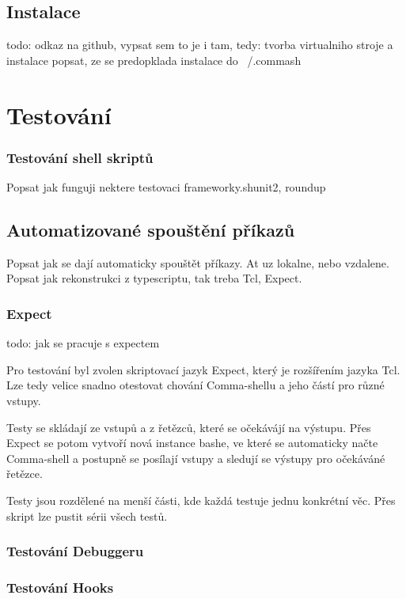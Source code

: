 \documentclass[thesis=M,czech]{FITthesis}[2012/06/26]
\begin{document}
\section{Instalace}
todo: odkaz na github, vypsat sem to je i tam, tedy: tvorba virtualniho stroje a instalace
popsat, ze se predopklada instalace do ~/.commash


%
%
\chapter{Testování}


\subsection{Testování shell skriptů}
Popsat jak funguji nektere testovaci frameworky.shunit2, roundup


\section{Automatizované spouštění příkazů}
Popsat jak se dají automaticky spouštět příkazy. At uz lokalne, nebo vzdalene. Popsat jak rekonstrukci z typescriptu, tak treba Tcl, Expect.

\subsection{Expect}
todo: jak se pracuje s expectem

Pro testování byl zvolen skriptovací jazyk Expect, který je rozšířením jazyka Tcl. Lze tedy velice snadno otestovat chování Comma-shellu a jeho částí pro různé vstupy.

Testy se skládají ze vstupů a z řetězců, které se očekávájí na výstupu. Přes Expect se potom vytvoří nová instance bashe, ve které se automaticky načte Comma-shell a postupně se posílají vstupy a sledují se výstupy pro očekáváné řetězce.

Testy jsou rozdělené na menší části, kde každá testuje jednu konkrétní věc. Přes skript lze pustit sérii všech testů.

\subsection{Testování Debuggeru}

\subsection{Testování Hooks}
\end{document}
